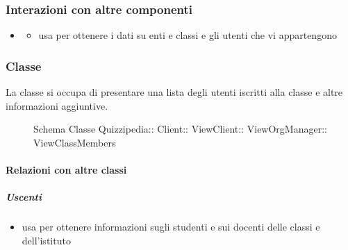 \subsubsection{Interazioni con altre componenti}
\begin{itemize}
\item {}
\begin{itemize}
\item usa  per ottenere i dati su enti e classi e gli utenti che vi appartengono
\end{itemize}
\end{itemize}
\subsubsection{Classe }
La classe si occupa di presentare una lista degli utenti iscritti alla classe e altre informazioni aggiuntive.
\begin{figure}[H]
\centering
\noindent{}
\caption[Schema Classe ViewClassMembers]{Schema Classe Quizzipedia:: Client:: ViewClient:: ViewOrgManager:: ViewClassMembers}
\end{figure}
\paragraph{Relazioni con altre classi}
\subparagraph{Uscenti}
\begin{itemize}
\item usa  per ottenere informazioni sugli studenti e sui docenti delle classi e dell'istituto
\end{itemize}
